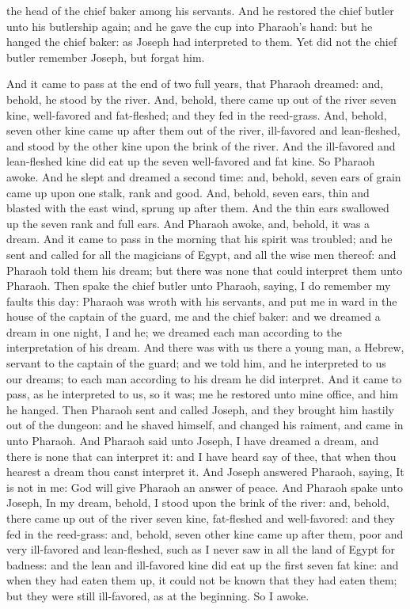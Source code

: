 the head of the chief baker among his servants. And he restored the chief butler unto his butlership again; and he gave the cup into Pharaoh’s hand: but he hanged the chief baker: as Joseph had interpreted to them. Yet did not the chief butler remember Joseph, but forgat him. 

And it came to pass at the end of two full years, that Pharaoh dreamed: and, behold, he stood by the river. And, behold, there came up out of the river seven kine, well-favored and fat-fleshed; and they fed in the reed-grass. And, behold, seven other kine came up after them out of the river, ill-favored and lean-fleshed, and stood by the other kine upon the brink of the river. And the ill-favored and lean-fleshed kine did eat up the seven well-favored and fat kine. So Pharaoh awoke. And he slept and dreamed a second time: and, behold, seven ears of grain came up upon one stalk, rank and good. And, behold, seven ears, thin and blasted with the east wind, sprung up after them. And the thin ears swallowed up the seven rank and full ears. And Pharaoh awoke, and, behold, it was a dream. And it came to pass in the morning that his spirit was troubled; and he sent and called for all the magicians of Egypt, and all the wise men thereof: and Pharaoh told them his dream; but there was none that could interpret them unto Pharaoh.  Then spake the chief butler unto Pharaoh, saying, I do remember my faults this day: Pharaoh was wroth with his servants, and put me in ward in the house of the captain of the guard, me and the chief baker: and we dreamed a dream in one night, I and he; we dreamed each man according to the interpretation of his dream. And there was with us there a young man, a Hebrew, servant to the captain of the guard; and we told him, and he interpreted to us our dreams; to each man according to his dream he did interpret. And it came to pass, as he interpreted to us, so it was; me he restored unto mine office, and him he hanged.  Then Pharaoh sent and called Joseph, and they brought him hastily out of the dungeon: and he shaved himself, and changed his raiment, and came in unto Pharaoh. And Pharaoh said unto Joseph, I have dreamed a dream, and there is none that can interpret it: and I have heard say of thee, that when thou hearest a dream thou canst interpret it. And Joseph answered Pharaoh, saying, It is not in me: God will give Pharaoh an answer of peace. And Pharaoh spake unto Joseph, In my dream, behold, I stood upon the brink of the river: and, behold, there came up out of the river seven kine, fat-fleshed and well-favored: and they fed in the reed-grass: and, behold, seven other kine came up after them, poor and very ill-favored and lean-fleshed, such as I never saw in all the land of Egypt for badness: and the lean and ill-favored kine did eat up the first seven fat kine: and when they had eaten them up, it could not be known that they had eaten them; but they were still ill-favored, as at the beginning. So I awoke. 